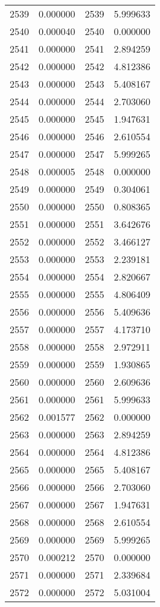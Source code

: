 \documentclass[12pt]{article}
\begin{document}
\begin{longtable}{@{}cccc@{}}
2539 & 0.000000 & 2539 & 5.999633 \\
2540 & 0.000040 & 2540 & 0.000000 \\
2541 & 0.000000 & 2541 & 2.894259 \\
2542 & 0.000000 & 2542 & 4.812386 \\
2543 & 0.000000 & 2543 & 5.408167 \\
2544 & 0.000000 & 2544 & 2.703060 \\
2545 & 0.000000 & 2545 & 1.947631 \\
2546 & 0.000000 & 2546 & 2.610554 \\
2547 & 0.000000 & 2547 & 5.999265 \\
2548 & 0.000005 & 2548 & 0.000000 \\
2549 & 0.000000 & 2549 & 0.304061 \\
2550 & 0.000000 & 2550 & 0.808365 \\
2551 & 0.000000 & 2551 & 3.642676 \\
2552 & 0.000000 & 2552 & 3.466127 \\
2553 & 0.000000 & 2553 & 2.239181 \\
2554 & 0.000000 & 2554 & 2.820667 \\
2555 & 0.000000 & 2555 & 4.806409 \\
2556 & 0.000000 & 2556 & 5.409636 \\
2557 & 0.000000 & 2557 & 4.173710 \\
2558 & 0.000000 & 2558 & 2.972911 \\
2559 & 0.000000 & 2559 & 1.930865 \\
2560 & 0.000000 & 2560 & 2.609636 \\
2561 & 0.000000 & 2561 & 5.999633 \\
2562 & 0.001577 & 2562 & 0.000000 \\
2563 & 0.000000 & 2563 & 2.894259 \\
2564 & 0.000000 & 2564 & 4.812386 \\
2565 & 0.000000 & 2565 & 5.408167 \\
2566 & 0.000000 & 2566 & 2.703060 \\
2567 & 0.000000 & 2567 & 1.947631 \\
2568 & 0.000000 & 2568 & 2.610554 \\
2569 & 0.000000 & 2569 & 5.999265 \\
2570 & 0.000212 & 2570 & 0.000000 \\
2571 & 0.000000 & 2571 & 2.339684 \\
2572 & 0.000000 & 2572 & 5.031004 \\

\end{longtable}
\end{document}
